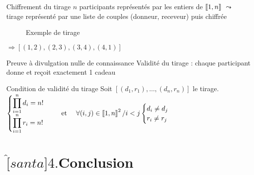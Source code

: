 \documentclass[10pt, compress]{beamer}
\begin{document}
  \begin{frame}{Chiffrement du tirage}
    $n$ participants représentés par les entiers de $\left\llbracket1, n\right\rrbracket$
    \bigbreak
    $\leadsto$ tirage représenté par une liste de \alert{couples (donneur, receveur)} puis chiffrée
    \bigbreak
    \begin{minipage}[h]{0.48\textwidth}
      \begin{figure}
        \caption{Exemple de tirage}
      \end{figure}
    \end{minipage}
    \begin{minipage}[h]{0.48\textwidth}
      $\Rightarrow [(1, 2), (2, 3), (3, 4), (4, 1)]$
    \end{minipage}
  \end{frame}

  \begin{frame}{Preuve à divulgation nulle de connaissance}
    Validité du tirage : chaque participant donne et reçoit exactement 1 cadeau
    \begin{alertblock}{Condition de validité du tirage}
      Soit $[(d_1, r_1), \ldots, (d_n, r_n)]$ le tirage.
        \(
        \begin{cases}
            \displaystyle\prod_{i=1}^nd_i=n ! \\
            \displaystyle\prod_{i=1}^nr_i=n !
        \end{cases}
        \quad\text{ et }\quad 
        \forall(i, j)\in\left\llbracket1, n\right\rrbracket^2 / i<j 
        \begin{cases}
          d_i\neq d_j \\
          r_i\neq r_j
      \end{cases}\)
    \end{alertblock}
  \end{frame}

\section{$\hat[santa]{\text{4.}}$\quad Conclusion}
\end{document}

